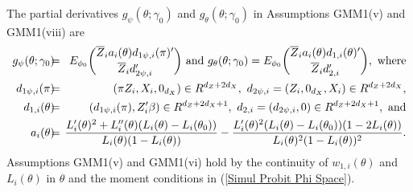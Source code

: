 \documentclass[12pt,thmsb,titlepage,final,oneside,letterpaper]{article}
\begin{document}
The partial derivatives $g_{\psi }(\theta ;\gamma _{0})$ and $g_{\theta
}(\theta ;\gamma _{0})$ in Assumptions GMM1(v) and GMM1\linebreak (viii) are 
\begin{eqnarray}
g_{\psi }(\theta ;\gamma _{0})\hspace{-0.08in} &=&\hspace{-0.08in}E_{\phi
_{0}}\binom{\overline{Z}_{i}a_{i}(\theta )d_{1\psi ,i}(\pi )^{\prime }}{%
\overline{Z}_{i}d_{2\psi ,i}^{\prime }}\text{ and }g_{\theta }(\theta
;\gamma _{0})=E_{\phi _{0}}\binom{\overline{Z}_{i}a_{i}(\theta
)d_{1,i}(\theta )^{\prime }}{\overline{Z}_{i}d_{2,i}^{\prime }},\text{ where}
\notag \\
d_{1\psi ,i}(\pi )\hspace{-0.08in} &=&\hspace{-0.08in}(\pi
Z_{i},X_{i},0_{d_{X}})\in R^{d_{Z}+2d_{X}},\text{ }d_{2\psi
,i}=(Z_{i},0_{d_{X}},X_{i})\in R^{d_{Z}+2d_{X}},  \notag \\
d_{1,i}(\theta )\hspace{-0.08in} &=&\hspace{-0.08in}(d_{1\psi ,i}(\pi
),Z_{i}^{\prime }\beta )\in R^{d_{Z}+2d_{X}+1},\text{ }d_{2,i}=(d_{2\psi
,i},0)\in R^{d_{Z}+2d_{X}+1},\text{ and}  \label{Probit_1st derivative} \\
a_{i}(\theta )\hspace{-0.08in} &=&\hspace{-0.08in}\frac{L_{i}^{\prime
}(\theta )^{2}+L_{i}^{\prime \prime }(\theta )(L_{i}(\theta )-L_{i}(\theta
_{0}))}{L_{i}(\theta )(1-L_{i}(\theta ))}-\frac{L_{i}^{\prime }(\theta
)^{2}(L_{i}(\theta )-L_{i}(\theta _{0}))(1-2L_{i}(\theta ))}{L_{i}(\theta
)^{2}(1-L_{i}(\theta ))^{2}}.  \notag
\end{eqnarray}%
Assumptions GMM1(v) and GMM1(vi) hold by the continuity of $w_{1,i}(\theta )$
and $L_{i}(\theta )$ in $\theta $ and the moment conditions in (\ref{Simul
Probit Phi Space}).
\end{document}
